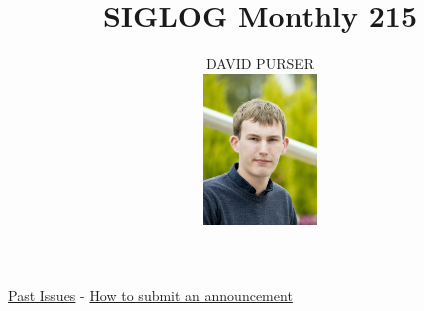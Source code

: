 \documentclass[prodmode,acmtecs]{acmsmall} %
\newcounter{colstart}
\begin{document}
\setcounter{colstart}{\thepage}

\title{\huge\sc SIGLOG Monthly 215}
\author{DAVID PURSER
\vspace*{-2.6cm}\begin{flushright}\includegraphics[width=30mm]{dp}\end{flushright}
}

\maketitlee

\href{https://lics.siglog.org/newsletters/}{Past Issues}
 - 
\href{https://lics.siglog.org/newsletters/inst.html}{How to submit an announcement}
\end{document}
